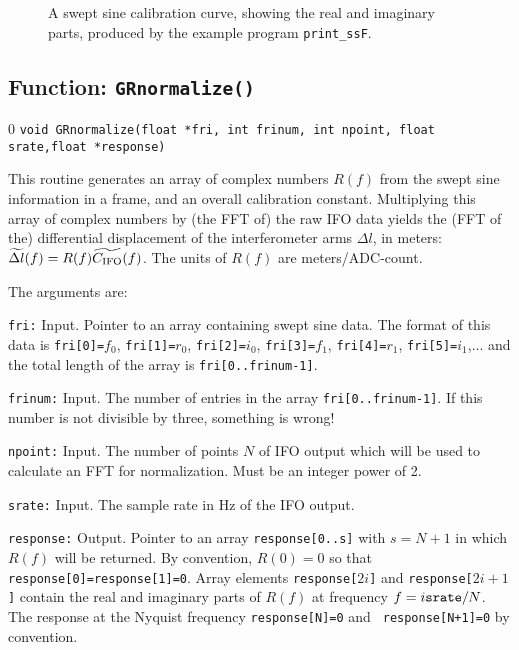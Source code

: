 
\begin{figure}[h]
\begin{center}
\caption{ \label{f:swept}
A swept sine calibration curve, showing the real and imaginary parts, produced by
the example program {\tt print\_ssF}.}
\end{center}
\end{figure}

\clearpage
\subsection{Function: {\tt GRnormalize()}}
\label{s:normalizeF}
\setcounter{equation}0
{\tt void GRnormalize(float *fri, int frinum, int npoint, float srate,float *response)}

This routine generates an array of complex numbers $R(f)$ from
the swept sine information in a frame, and an overall calibration
constant.  Multiplying this array of complex numbers by (the FFT of)
the raw IFO data yields the (FFT of the) differential displacement of
the interferometer arms $\Delta l$, in meters: $\widetilde{\Delta l}(f)
= R(f) \widetilde{C_{\rm IFO}}(f)$.  The units of $R(f)$ are meters/ADC-count.

The arguments are:
\begin{description}
\item{\tt fri:} Input.  Pointer to an array containing
  swept sine data.  The format of this data is {\tt fri[0]=}$f_0$,
{\tt fri[1]=}$r_0$, {\tt fri[2]=}$i_0$,
{\tt fri[3]=}$f_1$,
{\tt fri[4]=}$r_1$, {\tt fri[5]=}$i_1$,... and the total length of the
array is {\tt fri[0..frinum-1]}.
\item{\tt frinum:} Input.  The number of entries in the array  {\tt fri[0..frinum-1]}.
If this number is not divisible by three, something is wrong!
\item{\tt npoint:} Input.  The number of points $N$ of IFO output which will be used
to calculate an FFT for normalization.
Must be an integer power of 2.
\item{\tt srate:}  Input.  The sample rate in Hz of the IFO output.
\item{\tt response:} Output.  Pointer to an array {\tt response[0..s]}
with $s=N+1$ in which $R(f)$ will be returned.   By convention,
$R(0)=0$ so that {\tt response[0]=response[1]=0}.    Array elements
{\tt response[$2 i$]} and {\tt response[$2 i + 1$]} contain the real and
imaginary parts of $R(f)$ at frequency $f= i{\tt srate}/N$.   The
response at the Nyquist frequency {\tt response[N]=0} and {\tt
response[N+1]=0} by convention.
\end{description}

